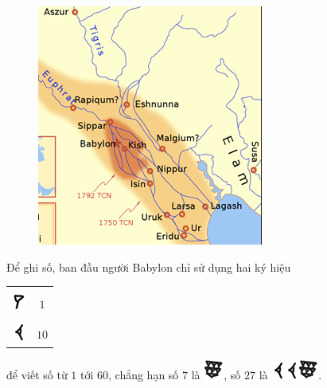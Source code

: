 \begin{multicols}{2}
\begin{figure}[H]
		\includegraphics[width=1\linewidth]{17.1}
		\vspace*{-15pt}
	\end{figure}
	Để ghi số, ban đầu người Babylon chỉ sử dụng hai ký hiệu 
	\begin{table}[H]
		\vspace*{-10pt}
		\centering
		\begin{tabular}{|c|c|}
			\hline
			& \\[-2.5ex]
			\includegraphics[scale=0.7]{15}&$1$\\
			\hline
			& \\[-2.5ex]
			\includegraphics[scale=0.65]{16}&$10$\\
			\hline
		\end{tabular}
		\vspace*{-10pt}
	\end{table}
	để viết số từ $1$ tới $60$, chẳng hạn số $7$ là  \includegraphics[scale=0.7]{17}, số $27$ là  \includegraphics[scale=0.7]{16}\includegraphics[scale=0.7]{16}\includegraphics[scale=0.7]{17}. 	 

\end{multicols}
